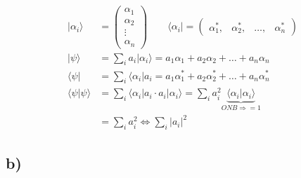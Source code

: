    \begin{align*}
        \vert \alpha_i \rangle &= 
        \begin{pmatrix}
            \alpha_1\\
            \alpha_2\\
            \vdots\\
            \alpha_n
        \end{pmatrix} \qquad
        \langle \alpha_i \vert =
        \begin{pmatrix}
            \alpha_1^*, & \alpha_2^*, & \ldots, & \alpha_n^*
        \end{pmatrix}\\
        \vert \psi \rangle &= \sum_{i} a_i \vert \alpha_i \rangle = a_1 \alpha_1 + a_2 \alpha_2 + \ldots + a_n \alpha_n\\
        \langle \psi \vert &= \sum_{i} \langle \alpha_i \vert a_i = a_1 \alpha_1^* + a_2 \alpha_2^* + \ldots + a_n \alpha_n^*\\
        \langle \psi \vert \psi \rangle &= \sum_{i} \langle \alpha_i \vert a_i \cdot a_i \vert \alpha_i \rangle 
        = \sum_{i} a_i^2 \underbrace{\langle \alpha_i \vert \alpha_i \rangle}_{ONB \Rightarrow =1}\\
        &= \sum_{i} a_i^2 \Leftrightarrow \sum_{i} \vert a_i \vert^2
    \end{align*}

\subsection{b)}

